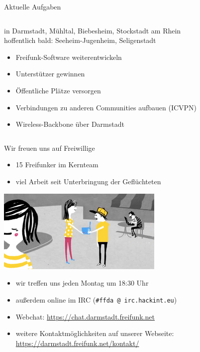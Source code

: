 \documentclass[10pt]{beamer}
\begin{document}
\begin{frame}{Aktuelle Aufgaben}
\begin{columns}[T]
\begin{column}{7cm}
\begin{itemize}
            \tiny in Darmstadt, Mühltal, Biebesheim, Stockstadt am Rhein\\
            \tiny hoffentlich bald: Seeheim-Jugenheim, Seligenstadt
        \end{itemize}
        \begin{itemize}
          \item Freifunk-Software weiterentwickeln
          \item Unterstützer gewinnen
          \item Öffentliche Plätze versorgen
          \item Verbindungen zu anderen Communities aufbauen (ICVPN)
          \item Wireless-Backbone über Darmstadt
        \end{itemize}
        \end{column}
      \end{columns}

    \end{frame}

    \begin{frame}{Wir freuen uns auf Freiwillige}
      \begin{itemize}
        \item 15 Freifunker im Kernteam
        \item viel Arbeit seit Unterbringung der Geflüchteten
      \end{itemize}
      \vfill
      \hspace{2em}\includegraphics[width=0.6\textwidth]{images/router}
      \vfill
      \begin{itemize}
        \pause
        \item wir treffen uns jeden Montag um 18:30 Uhr
        \item außerdem online im IRC (\texttt{\#ffda @ irc.hackint.eu})
        \item Webchat: \url{https://chat.darmstadt.freifunk.net}
        \item weitere Kontaktmöglichkeiten auf unserer Webseite:\\
        \url{https://darmstadt.freifunk.net/kontakt/}
      \end{itemize}
    \end{frame}
\end{document}
